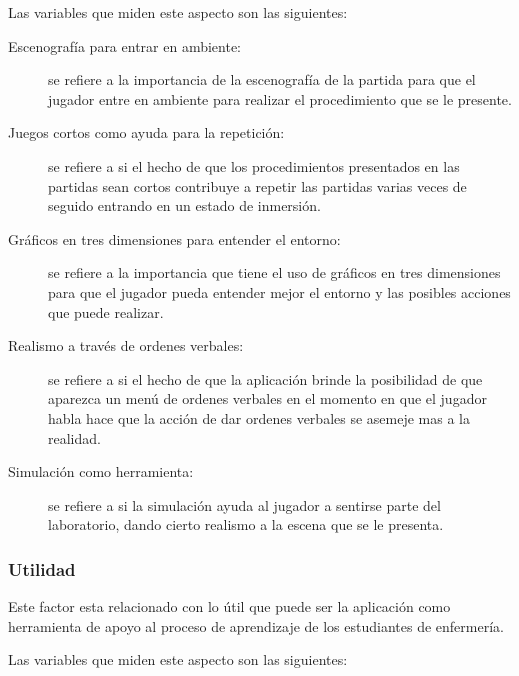 Las variables que miden este aspecto son las siguientes:

\begin{description}

\item[Escenografía para entrar en ambiente:] se refiere a la importancia de la
    escenografía de la partida para que el jugador entre en ambiente para
    realizar el procedimiento que se le presente.

\item[Juegos cortos como ayuda para la repetición:] se refiere a si el hecho de
    que los procedimientos presentados en las partidas sean cortos contribuye a
    repetir las partidas varias veces de seguido entrando en un estado de
    inmersión.

\item[Gráficos en tres dimensiones para entender el entorno:] se refiere a la
    importancia que tiene el uso de gráficos en tres dimensiones para que el
    jugador pueda entender mejor el entorno y las posibles acciones que puede
    realizar.

\item[Realismo a través de ordenes verbales:] se refiere a si el hecho de que la
    aplicación brinde la posibilidad de que aparezca un menú de ordenes verbales
    en el momento en que el jugador habla hace que la acción de dar ordenes
    verbales se asemeje mas a la realidad.

\item[Simulación como herramienta:] se refiere a si la simulación ayuda al
    jugador a sentirse parte del laboratorio, dando cierto realismo a la escena
    que se le presenta.

\end{description}

\subsubsection{Utilidad}

Este factor esta relacionado con lo útil que puede ser la aplicación como
herramienta de apoyo al proceso de aprendizaje de los estudiantes de enfermería.

Las variables que miden este aspecto son las siguientes:

